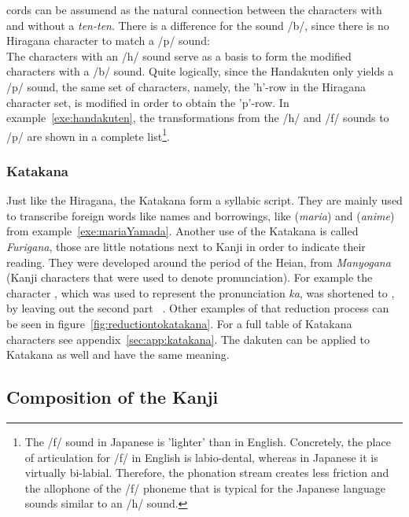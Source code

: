 cords can be assumend as the natural connection between the characters with and 
without a \emph{ten-ten}. There is a difference for the sound /b/, since there is
no Hiragana character to match a /p/ sound:\\
The characters with an /h/ sound serve as a basis to form the modified 
characters with a /b/ sound.
Quite logically, since the Handakuten only yields a /p/ sound, the same set of
characters, namely, the 'h'-row in the Hiragana character set, is modified in 
order to obtain the 'p'-row. In example~\ref{exe:handakuten}, the transformations
from the /h/ and /f/ sounds to /p/ are shown in a complete list\footnote{
The /f/ sound in Japanese is 'lighter' than in English. Concretely, the place of
articulation for /f/ in English is labio-dental, whereas in Japanese it is 
virtually bi-labial. Therefore, the phonation stream creates less friction and
the allophone of the /f/ phoneme that is typical for the Japanese language sounds
similar to an /h/ sound.}.

\subsubsection{Katakana }
\label{sec:katakana}

Just like the Hiragana, the Katakana form a syllabic script. They are mainly used
to transcribe foreign words like names and borrowings, like 
(\emph{maria}) and  (\emph{anime}) from 
example~\ref{exe:mariaYamada}. Another use of the Katakana is called 
\emph{Furigana}, those are little notations next to Kanji in order to 
indicate their reading. They were developed around the period of the Heian, from 
\emph{Manyogana} (Kanji characters that were used to denote pronunciation).
For example the character , which was used to represent the pronunciation
\emph{ka}, was shortened to , by leaving out the second part 
~. Other examples of that reduction process
can be seen in figure~\ref{fig:reductiontokatakana}. For a full table of 
Katakana characters see appendix~\ref{sec:app:katakana}. The dakuten can be 
applied to Katakana as well and have the same meaning.

\subsection{Composition of the Kanji }
\label{sec:compositionofKanji}

